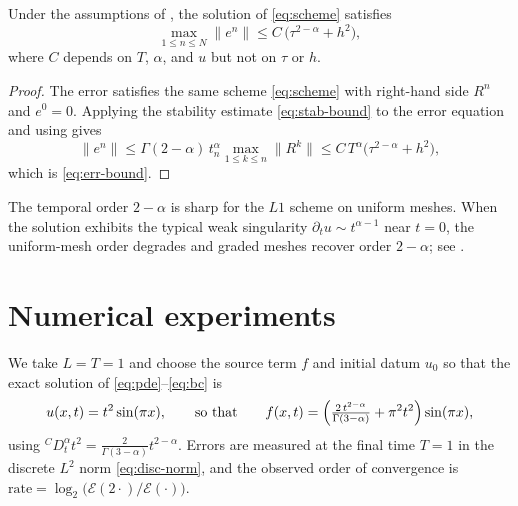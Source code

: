 \documentclass[11pt]{ajam}
\newcommand{\dtt}{{}^{C}\!D_t^{\alpha}}
\newcommand{\norm}[1]{\lVert #1 \rVert}
\newcommand{\Gam}{\Gamma}
\begin{document}
\begin{theorem}[Convergence]\label{thm:convergence}
Under the assumptions of , the solution of
\eqref{eq:scheme} satisfies
\begin{equation}\label{eq:err-bound}
  \max_{1\le n\le N}\norm{e^n}
  \le C\,\bigl(\tau^{2-\alpha}+h^{2}\bigr),
\end{equation}
where $C$ depends on $T$, $\alpha$, and $u$ but not on $\tau$ or $h$.
\end{theorem}

\begin{proof}
The error satisfies the same scheme \eqref{eq:scheme} with right-hand side
$R^n$ and $e^0=0$. Applying the stability estimate \eqref{eq:stab-bound} to
the error equation and using  gives
\begin{equation}
  \norm{e^n}\le \Gam(2-\alpha)\,t_n^{\alpha}\max_{1\le k\le n}\norm{R^k}
  \le C\,T^{\alpha}\bigl(\tau^{2-\alpha}+h^2\bigr),
\end{equation}
which is \eqref{eq:err-bound}.
\end{proof}

\begin{remark}
The temporal order $2-\alpha$ is sharp for the $L1$ scheme on uniform
meshes. When the solution exhibits the typical weak singularity
$\partial_t u\sim t^{\alpha-1}$ near $t=0$, the uniform-mesh order degrades
and graded meshes recover order $2-\alpha$; see
\citep{StynesORiordanGracia2017}.
\end{remark}

\section{Numerical experiments}\label{sec:numerics}
We take $L=T=1$ and choose the source term $f$ and initial datum $u_0$ so
that the exact solution of \eqref{eq:pde}--\eqref{eq:bc} is
\begin{equation}\label{eq:exact}
  u(x,t) = t^{2}\sin(\pi x),
  \qquad\text{so that}\qquad
  f(x,t) = \Bigl(\tfrac{2\,t^{2-\alpha}}{\Gam(3-\alpha)}
           + \pi^{2}t^{2}\Bigr)\sin(\pi x),
\end{equation}
using $\dtt t^{2}=\tfrac{2}{\Gam(3-\alpha)}t^{2-\alpha}$. Errors are
measured at the final time $T=1$ in the discrete $L^2$ norm
\eqref{eq:disc-norm}, and the observed order of convergence is
$\mathrm{rate}=\log_2\!\bigl(\mathcal{E}(2\cdot)/\mathcal{E}(\cdot)\bigr)$.
\end{document}
